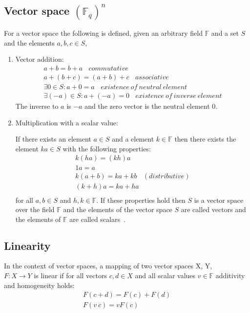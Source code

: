 \documentclass[11pt,
  oneside,openany,    %
]{scrreprt}
\begin{document}
\subsection{Vector space $(\mathbb{F}_{q})^{n}$}
For a vector space the following is defined, given an arbitrary field $\mathbb{F}$ and a set $S$ and the elements $a, b, c \in S$,

\begin{enumerate}
\item Vector addition:
\begin{gather*}
a + b = b + a \ \ \ \ commutative\\ 
a + (b + c) = (a + b) + c \ \ \ \ associative\\
\exists 0 \in S: a + 0 = a \ \ \ \ existence \ of \ neutral \ element\\
\exists (-a) \in S: a + (- a) = 0 \ \ \ \ existence \ of \ inverse \ element
\end{gather*}
The inverse to $a$ is $-a$ and the zero vector is the neutral element $0$.\vspace{0.5cm}

\item Multiplication with a scalar value:

If there exists an element $a \in S$ and a element $k \in \mathbb{F}$ then there exists the element $ka \in S$ with the following properties:
\begin{gather*}
k(h a) = (kh)a\\
1a = a\\
k(a + b) = ka + kb \ \ \ \ (distributive)\\
(k + h)a = ka + ha\\
\end{gather*}
for all $a, b \in S$ and $h, k \in \mathbb{F}$.
If these properties hold then $S$ is a vector space over the field $\mathbb{F}$ and the elements of the vector space $S$ are called vectors and the elements of $\mathbb{F}$ are called scalars~\cite{mathefuerInfoBand1}.
\end{enumerate}

\subsection{Linearity}

In the context of vector spaces, a mapping of two vector spaces X, Y, \\ $F:X \xrightarrow{} Y $ is linear if for all vectors $c, d \in X$ and all scalar values $v \in \mathbb{F}$ additivity and homogeneity holds:
\begin{gather*}
F(c + d) = F(c) + F(d)\\
F(v \ c) = v F(c)
\end{gather*}
\end{document}
